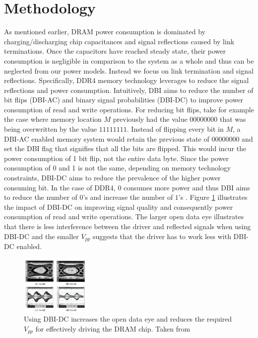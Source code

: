 \section{Methodology}
\label{sec-methodology}


As mentioned earlier, DRAM power consumption is dominated by
charging/discharging chip capacitances and signal reflections caused by link
terminations. Once the capacitors have reached steady state, their power
consumption is negligible in comparison to the system as a whole and thus can
be neglected from our power models. Instead we focus on link termination and
signal reflections. Specifically, DDR4 memory technology leverages  to
reduce the signal reflections and power consumption. Intuitively, DBI aims to
reduce the number of bit flips (DBI-AC) and binary signal probabilities
(DBI-DC) to improve power consumption of read and write operations. For
reducing bit flips, take for example the case where memory location $M$
previously had the value $00000000$ that was being overwritten by the value
$11111111$. Instead of flipping every bit in $M$, a DBI-AC enabled memory system
would retain the previous state of $00000000$ and set the DBI flag that
signifies that all the bits are flipped.  This would incur the power consumption
of 1 bit flip, not the entire data byte.  Since the power consumption of 0 and
1 is not the same, depending on memory technology constraints, DBI-DC aims to
reduce the prevalence of the higher power consuming bit. In the case of DDR4,
$0$ consumes more power and thus DBI aims to reduce the number of $0$'s and
increase the number of $1$'s \cite{low-power-dram}. Figure \ref{fig:dbi-dc}
illustrates the impact of DBI-DC on improving signal quality and consequently
power consumption of read and write operations. The larger open data eye
illustrates that there is less interference between the driver and reflected
signals when using DBI-DC and the smaller $V_{pp}$ suggests that the driver has
to work less with DBI-DC enabled.

\begin{figure}[!htb]
  \centering
  \includegraphics[width=0.3\textwidth]{figs/dbi-dc}
  \caption{Using DBI-DC increases the open data eye and reduces the required
  $V_{pp}$ for effectively driving the DRAM chip. Taken from \cite{hollis}}
  \label{fig:dbi-dc}
\end{figure}

